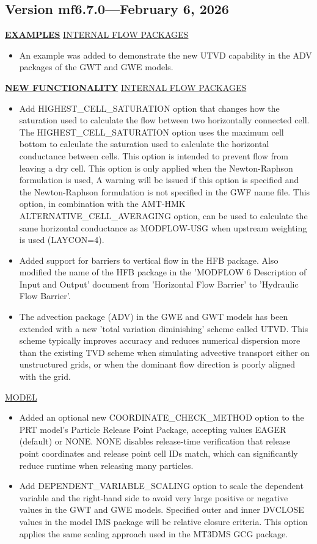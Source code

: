 \subsection{Version mf6.7.0---February 6, 2026}

\textbf{\underline{EXAMPLES}}
\underline{INTERNAL FLOW PACKAGES}
\begin{itemize}
\item An example was added to demonstrate the new UTVD capability in the ADV packages of the GWT and GWE models.
\end{itemize}

\textbf{\underline{NEW FUNCTIONALITY}}
\underline{INTERNAL FLOW PACKAGES}
\begin{itemize}
\item Add HIGHEST\_CELL\_SATURATION option that changes how the saturation used to calculate the flow between two horizontally connected cell. The HIGHEST\_CELL\_SATURATION option uses the maximum cell bottom to calculate the saturation used to calculate the horizontal conductance between cells. This option is intended to prevent flow from leaving a dry cell. This option is only applied when the Newton-Raphson formulation is used, A warning will be issued if this option is specified and the Newton-Raphson formulation is not specified in the GWF name file. This option, in combination with the AMT-HMK ALTERNATIVE\_CELL\_AVERAGING option, can be used to calculate the same horizontal conductance as MODFLOW-USG when upstream weighting is used (LAYCON=4).
\item Added support for barriers to vertical flow in the HFB package. Also modified the name of the HFB package in the 'MODFLOW 6 Description of Input and Output' document from 'Horizontal Flow Barrier' to 'Hydraulic Flow Barrier'.
\item The advection package (ADV) in the GWE and GWT models has been extended with a new 'total variation diminishing' scheme called UTVD. This scheme typically improves accuracy and reduces numerical dispersion more than the existing TVD scheme when simulating advective transport either on unstructured grids, or when the dominant flow direction is poorly aligned with the grid.
\end{itemize}

\underline{MODEL}
\begin{itemize}
\item Added an optional new COORDINATE\_CHECK\_METHOD option to the PRT model's Particle Release Point Package, accepting values EAGER (default) or NONE. NONE disables release-time verification that release point coordinates and release point cell IDs match, which can significantly reduce runtime when releasing many particles.
\item Add DEPENDENT\_VARIABLE\_SCALING option to scale the dependent variable and the right-hand side to avoid very large positive or negative values in the GWT and GWE models. Specified outer and inner DVCLOSE values in the model IMS package will be relative closure criteria. This option applies the same scaling approach used in the MT3DMS GCG package.
\end{itemize}


